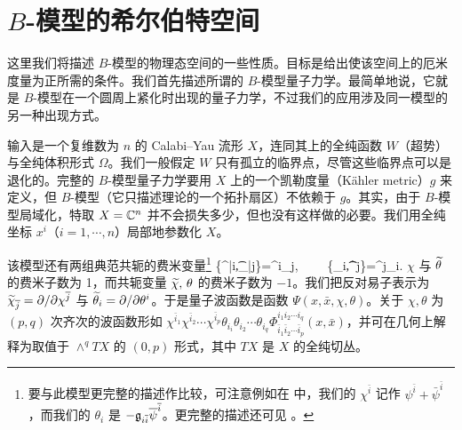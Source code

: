 
\section{$B$-模型的希尔伯特空间}\label{bmodel}

这里我们将描述 $B$-模型的物理态空间的一些性质。目标是给出使该空间上的厄米度量为正所需的条件。我们首先描述所谓的 $B$-模型量子力学。最简单地说，它就是 $B$-模型在一个圆周上紧化时出现的量子力学，不过我们的应用涉及同一模型的另一种出现方式。

输入是一个复维数为 $n$ 的 Calabi–Yau 流形 $X$，连同其上的全纯函数 $W$（超势）与全纯体积形式 $\varOmega$。我们一般假定 $W$ 只有孤立的临界点，尽管这些临界点可以是退化的。完整的 $B$-模型量子力学要用 $X$ 上的一个凯勒度量（Kähler metric）$g$ 来定义，但 $B$-模型（它只描述理论的一个拓扑扇区）不依赖于 $g$。其实，由于 $B$-模型局域化，特取 $X={\mathbb C}^n$ 并不会损失多少，但也没有这样做的必要。我们用全纯坐标 $x^i$（$i=1,\cdots, n$）局部地参数化 $X$。

该模型还有两组典范共轭的费米变量\footnote{要与此模型更完整的描述作比较，可注意例如在 \cite{Vafa} 中，我们的 $\chi^{\bar i}$ 记作 $\psi^{\bar i}+\bar\psi^{\bar i}$，而我们的 $\theta_i$ 是 $-{\mathfrak g}_{i\overline i}\overline\psi^{\overline i}$。更完整的描述还可见 \cite{WittenE}。}
\be\label{nimbo} \{\chi^{\bar i},\t \chi_{\bar j}\}=\delta^i_j,~~~~ \{\theta_i,\t\theta^j\}=\delta^j_i. \ee    $\chi$ 与 $\widetilde\theta$ 的费米子数为 1，而共轭变量 $\widetilde\chi,\,\theta$ 的费米子数为 $-1$。我们把反对易子表示为 $\widetilde\chi_{\overline j}=\partial/\partial \chi^{\overline j}$ 与 $\widetilde\theta_i=\partial/\partial\theta^i$。于是量子波函数是函数 $\Psi(x,\bar x, \chi, \theta)$。关于 $\chi,\theta$ 为 $(p,q)$ 次齐次的波函数形如 $\chi^{\bar i_1}\chi^{\bar i_2}\cdots \chi^{\bar i_p}
\theta_{i_i}\theta_{i_2}\cdots \theta_{i_q} \Phi_{\bar i_1\bar i_2\cdots \bar i_p} ^{i_1 i_2 \cdots i_q}(x,\bar x)$，并可在几何上解释为取值于 $\wedge^q TX$ 的 $(0,p)$ 形式，其中 $TX$ 是 $X$ 的全纯切丛。

